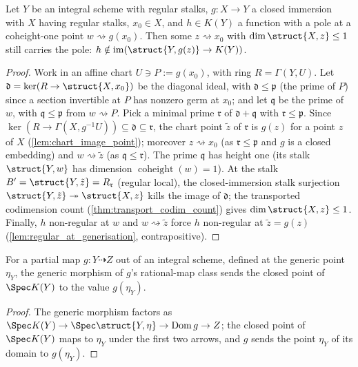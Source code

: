 \begin{theorem}
  \label{thm:transport_kernel}
  \leanok
  Let \(Y\) be an integral scheme with regular stalks, \(g : X \to Y\) a closed
  immersion with \(X\) having regular stalks, \(x_0 \in X\), and \(h \in K(Y)\) a
  function with a pole at a coheight-one point \(w \rightsquigarrow g(x_0)\). Then
  some \(z \rightsquigarrow x_0\) with \(\dim\struct{X,z} \le 1\) still carries
  the pole: \(h \notin \operatorname{im}(\struct{Y,g(z)} \to K(Y))\).
\end{theorem}
\begin{proof}
  \leanok
  Work in an affine chart \(U \ni P := g(x_0)\), with ring \(R = \Gamma(Y, U)\).
  Let \(\mathfrak d = \ker(R \to \struct{X,x_0})\) be the diagonal ideal, with
  \(\mathfrak d \le \mathfrak p\) (the prime of \(P\)) since a section invertible
  at \(P\) has nonzero germ at \(x_0\); and let \(\mathfrak q\) be the prime of
  \(w\), with \(\mathfrak q \le \mathfrak p\) from \(w \rightsquigarrow P\). Pick
  a minimal prime \(\mathfrak r\) of \(\mathfrak d + \mathfrak q\) with
  \(\mathfrak r \le \mathfrak p\). Since \(\ker(R \to \Gamma(X, g^{-1}U))
  \subseteq \mathfrak d \subseteq \mathfrak r\), the chart point \(\tilde z\) of
  \(\mathfrak r\) is \(g(z)\) for a point \(z\) of \(X\)
  (\ref{lem:chart_image_point}); moreover \(z \rightsquigarrow x_0\) (as
  \(\mathfrak r \le \mathfrak p\) and \(g\) is a closed embedding) and
  \(w \rightsquigarrow \tilde z\) (as \(\mathfrak q \le \mathfrak r\)). The prime
  \(\mathfrak q\) has height one (its stalk \(\struct{Y,w}\) has dimension
  \(\operatorname{coheight}(w) = 1\)). At the stalk \(B' = \struct{Y,\tilde z} =
  R_{\mathfrak r}\) (regular local), the closed-immersion stalk surjection
  \(\struct{Y,\tilde z} \twoheadrightarrow \struct{X,z}\) kills the image of
  \(\mathfrak d\); the transported codimension count
  (\ref{thm:transport_codim_count}) gives \(\dim\struct{X,z} \le 1\). Finally,
  \(h\) non-regular at \(w\) and \(w \rightsquigarrow \tilde z\) force \(h\)
  non-regular at \(\tilde z = g(z)\) (\ref{lem:regular_at_generisation},
  contrapositive).
\end{proof}

\begin{lemma}
  \label{lem:generic_value_bridge}
  \leanok
  For a partial map \(g : Y \dashrightarrow Z\) out of an integral scheme,
  defined at the generic point \(\eta_Y\), the generic morphism of
  \(g\)'s rational-map class sends the closed point of \(\Spec K(Y)\) to the
  value \(g(\eta_Y)\).
\end{lemma}
\begin{proof}
  \leanok
  The generic morphism factors as \(\Spec K(Y) \to \Spec\struct{Y,\eta} \to
  \operatorname{Dom} g \to Z\); the closed point of \(\Spec K(Y)\) maps to
  \(\eta_Y\) under the first two arrows, and \(g\) sends the point \(\eta_Y\) of
  its domain to \(g(\eta_Y)\).
\end{proof}

